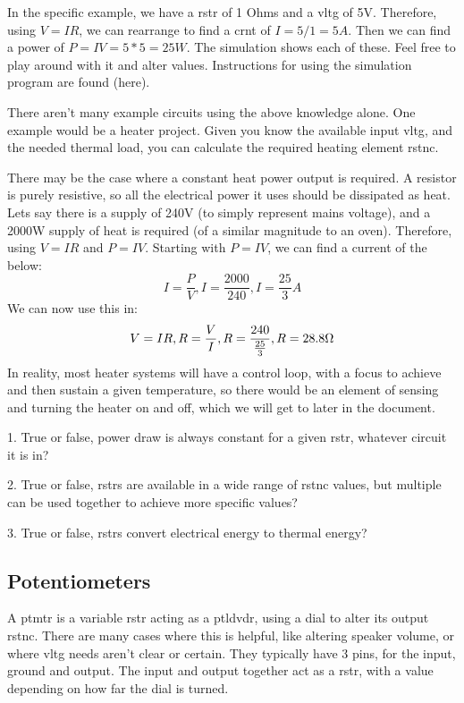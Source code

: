 \documentclass[a4paper,11pt]{report}
\newcommand{\Examples}[1] %
{
\par\noindent %
\phantomsection %
\todo[inline, color=red!30]{\textbf{#1}} %
\vspace{1em} %
}
\newcommand{\Quiz}[1] %
{
\par\noindent %
\phantomsection %
\todo[inline, color=blue!30]{\textbf{#1}} %
\vspace{1em} %
}
\begin{document}
In the specific example, we have a \gls{rstr} of 1 Ohms and a \gls{vltg} of 5V. Therefore, using $V=IR$, we can rearrange to find a \gls{crnt} of $I = 5/1 = 5A$. Then we can find a power of $P = IV = 5*5 = 25W$. The simulation shows each of these. Feel free to play around with it and alter values. Instructions for using the simulation program are found (here).

\Examples{Example circuits etc}

There aren't many example circuits using the above knowledge alone. One example would be a heater project. Given you know the available input \gls{vltg}, and the needed thermal load, you can calculate the required heating element \gls{rstnc}.

There may be the case where a constant heat power output is required. A resistor is purely resistive, so all the electrical power it uses should be dissipated as heat. Lets say there is a supply of 240V (to simply represent mains voltage), and a 2000W supply of heat is required (of a similar magnitude to an oven). Therefore, using $V=IR$ and $P=IV$. Starting with $P=IV$, we can find a current of the below:
\[I=\frac{P}{V}, I=\frac{2000}{240}, I=\frac{25}{3}A\]
We can now use this in:
\[V=IR, R=\frac{V}{I}, R=\frac{240}{\frac{25}{3}}, R=28.8\ohm\]
In reality, most heater systems will have a control loop, with a focus to achieve and then sustain a given temperature, so there would be an element of sensing and turning the heater on and off, which we will get to later in the document.

\Quiz{Quiz}

1. True or false, power draw is always constant for a given \gls{rstr}, whatever circuit it is in?

2. True or false, \gls{rstr}s are available in a wide range of \gls{rstnc} values, but multiple can be used together to achieve more specific values?

3. True or false, \gls{rstr}s convert electrical energy to thermal energy?

\vspace*{1\baselineskip}

\subsection{Potentiometers}

A \gls{ptmtr} is a variable \gls{rstr} acting as a \gls{ptldvdr}, using a dial to alter its output \gls{rstnc}. There are many cases where this is helpful, like altering speaker volume, or where \gls{vltg} needs aren't clear or certain. They typically have 3 pins, for the input, ground and output. The input and output together act as a \gls{rstr}, with a value depending on how far the dial is turned.
\end{document}
